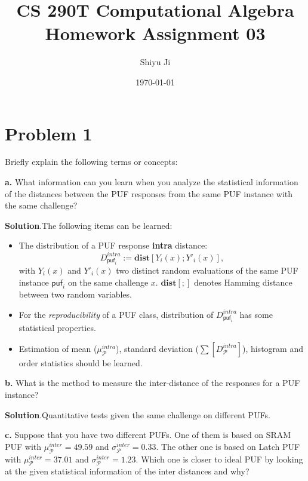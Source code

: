 \documentclass[12pt]{article}
\theoremstyle{plain}
\begin{document}
\title{CS 290T Computational Algebra Homework Assignment 03}
\author{Shiyu Ji}
\date{\today}
\maketitle

\newcommand{\m}[1]{\begin{bmatrix}#1\end{bmatrix}}
\newcommand{\rank}[1]{\operatorname{rank}(#1)}
\newcommand{\F}{\mathbb{F}}
\newcommand{\Sol}{\textbf{Solution}.}

\section{Problem 1}
Briefly explain the following terms or concepts:

{\bf a.} What information can you learn when you analyze the statistical
information of the distances between the PUF responses from the
same PUF instance with the same challenge?

\newcommand{\p}{\mathcal{P}}
\newcommand{\puf}{\textsf{puf}}
\newcommand{\dist}{\textbf{dist}}
\Sol The following items can be learned:
\begin{itemize}
\item The distribution of a PUF response {\bf intra} distance:
$$D_{\puf_i}^{intra} := \dist[Y_i(x); Y'_i(x)],$$
with $Y_i(x)$ and $Y'_i(x)$ two distinct random evaluations of the same PUF instance $\puf_i$ on the same challenge $x$. $\dist[;]$ denotes Hamming distance between two random variables.
\item For the \emph{reproducibility} of a PUF class, distribution of $D_{\puf_i}^{intra}$ has some statistical properties.
\item Estimation of mean ($\mu_{\p}^{intra}$), standard deviation ($\sum[D_{\p}^{intra}]$), histogram and order statistics should be learned.
\end{itemize}

{\bf b.} What is the method to measure the inter-distance of the responses
for a PUF instance?

\Sol Quantitative tests given the same challenge on different PUFs.


{\bf c.} Suppose that you have two different PUFs. One of them is based
on SRAM PUF with $\mu_{\p}^{inter} = 49.59$ and $\sigma_{\p}^{inter} = 0.33$. The other one is based on Latch PUF with $\mu_{\p}^{inter} = 37.01$ and $\sigma_{\p}^{inter} = 1.23$. Which one is closer to ideal PUF by looking at the given statistical
information of the inter distances and why?
\end{document}
